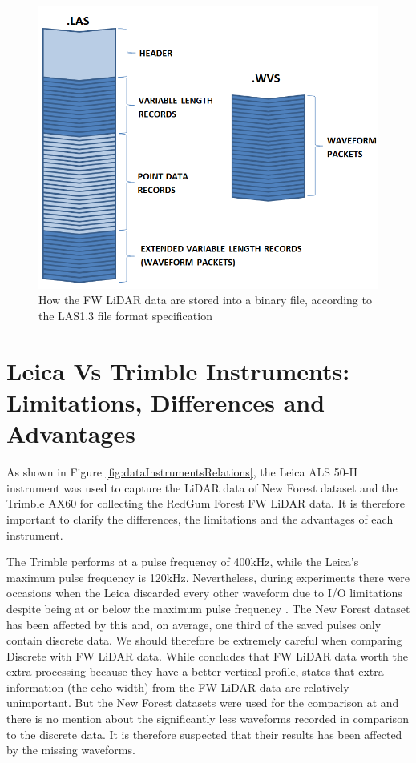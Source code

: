 \documentclass{subfiles}
\begin{document}
	 \begin{figure}[!htbp]
           \centering
           \includegraphics[width=\textwidth/3*2]{img/LAS1_3_fileFormat}
           \caption[LAS1.3 File Format]{How the FW LiDAR data are stored into a binary file, according to the LAS1.3 file format specification }
           \label{fig:LAS1_3_fileFormat}
      \end{figure}

	\section{Leica Vs Trimble Instruments: Limitations, Differences and Advantages}\label{sec:LeicaVsTrimble}
	
	
	\par As shown in Figure \ref{fig:dataInstrumentsRelations}, the Leica ALS 50-II instrument was used to capture the LiDAR data of New Forest dataset and the Trimble AX60 for collecting the RedGum Forest FW LiDAR data. It is therefore important to clarify the differences, the limitations and the advantages of each instrument. 
	
	\par The Trimble performs at a pulse frequency of 400kHz, while the Leica's maximum pulse frequency is 120kHz. Nevertheless, during experiments there were occasions when the Leica discarded every other waveform due to I/O limitations despite being at or below the maximum pulse frequency \cite{Warren2012}. The New Forest dataset has been affected by this and, on average, one third of the saved pulses only contain discrete data. We should therefore be extremely careful when comparing Discrete with FW LiDAR data. While \cite{Anderson2015} concludes that FW LiDAR data worth the extra processing because they have a better vertical profile, \cite{Sumnall2016} states that extra information (the echo-width) from the FW LiDAR data are relatively unimportant. But the New Forest datasets were used for the comparison at \cite{Sumnall2016} and there is no mention about the significantly less waveforms recorded in comparison to the discrete data. It is therefore suspected that their results has been affected by the missing waveforms. 
	
\end{document}
